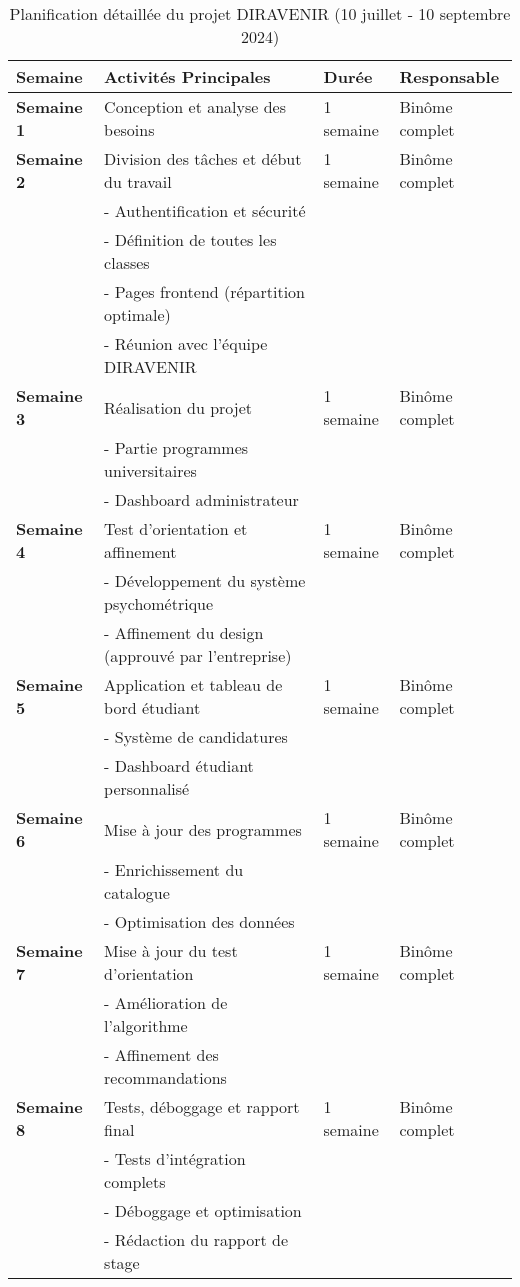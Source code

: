 \documentclass[12pt,a4paper]{report}
\begin{document}
\begin{table}[H]
\centering
\begin{tabular}{|p{2cm}|p{6.5cm}|p{3.5cm}|p{3cm}|}
\hline
\textbf{Semaine} & \textbf{Activités Principales} & \textbf{Durée} & \textbf{Responsable} \\
\hline
\textbf{Semaine 1} & Conception et analyse des besoins & 1 semaine & Binôme complet \\
\hline
\textbf{Semaine 2} & Division des tâches et début du travail & 1 semaine & Binôme complet \\
& - Authentification et sécurité & & \\
& - Définition de toutes les classes & & \\
& - Pages frontend (répartition optimale) & & \\
& - Réunion avec l'équipe DIRAVENIR & & \\
\hline
\textbf{Semaine 3} & Réalisation du projet & 1 semaine & Binôme complet \\
& - Partie programmes universitaires & & \\
& - Dashboard administrateur & & \\
\hline
\textbf{Semaine 4} & Test d'orientation et affinement & 1 semaine & Binôme complet \\
& - Développement du système psychométrique & & \\
& - Affinement du design (approuvé par l'entreprise) & & \\
\hline
\textbf{Semaine 5} & Application et tableau de bord étudiant & 1 semaine & Binôme complet \\
& - Système de candidatures & & \\
& - Dashboard étudiant personnalisé & & \\
\hline
\textbf{Semaine 6} & Mise à jour des programmes & 1 semaine & Binôme complet \\
& - Enrichissement du catalogue & & \\
& - Optimisation des données & & \\
\hline
\textbf{Semaine 7} & Mise à jour du test d'orientation & 1 semaine & Binôme complet \\
& - Amélioration de l'algorithme & & \\
& - Affinement des recommandations & & \\
\hline
\textbf{Semaine 8} & Tests, déboggage et rapport final & 1 semaine & Binôme complet \\
& - Tests d'intégration complets & & \\
& - Déboggage et optimisation & & \\
& - Rédaction du rapport de stage & & \\
\hline
\end{tabular}
\caption{Planification détaillée du projet DIRAVENIR (10 juillet - 10 septembre 2024)}
\end{table}
\end{document}
